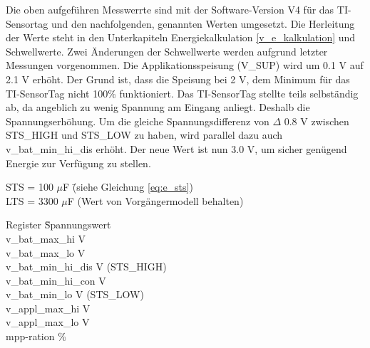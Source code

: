 Die oben aufgeführen Messwerrte sind mit der Software-Version V4 für das TI-Sensortag und den nachfolgenden, genannten Werten umgesetzt. Die Herleitung der Werte steht in den Unterkapiteln Energiekalkulation \ref{v_e_kalkulation} und Schwellwerte. Zwei Änderungen der Schwellwerte werden aufgrund letzter Messungen vorgenommen. Die Applikationsspeisung (V\_SUP) wird um 0.1 V auf 2.1 V erhöht. Der Grund ist, dass die Speisung bei 2 V, dem Minimum für das TI-SensorTag nicht 100\thinspace\% funktioniert. Das TI-SensorTag stellte teils selbständig ab, da angeblich zu wenig Spannung am Eingang anliegt. Deshalb die Spannungserhöhung. Um die gleiche Spannungsdifferenz von $\Delta$ 0.8 V zwischen STS\_HIGH und STS\_LOW zu haben, wird parallel dazu auch  v\_bat\_min\_hi\_dis erhöht. Der neue Wert ist nun 3.0 V, um sicher genügend Energie zur Verfügung zu stellen.


\begin{tabbing}
STS = 100 $\mu$F \hspace{1cm} \= (siehe Gleichung \ref{eq:e_sts})\\
LTS = 3300 $\mu$F             \> (Wert von Vorgängermodell behalten)
\end{tabbing}

\begin{minipage}{\textwidth}
    \begin{tabbing}
        Register \hspace{2cm} \quad\= Spannungswert \\[0.8ex]
        v\_bat\_max\_hi        V \\
        v\_bat\_max\_lo        V \\
        v\_bat\_min\_hi\_dis   V  (STS\_HIGH)\\
        v\_bat\_min\_hi\_con   V \\
        v\_bat\_min\_lo        V (STS\_LOW)\\
        v\_appl\_max\_hi       V \\
        v\_appl\_max\_lo       V \\   
        mpp-ration            \thinspace\%
    \end{tabbing}
\end{minipage}  



